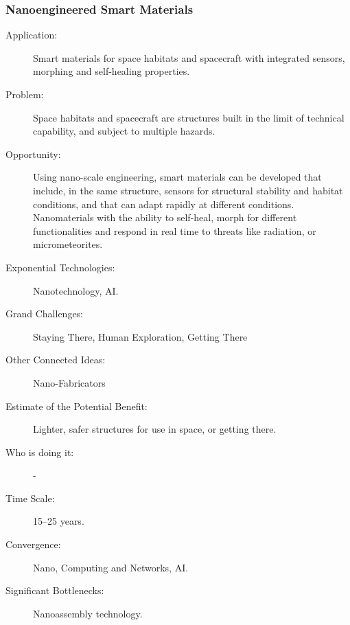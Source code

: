      \subsubsection{Nanoengineered Smart Materials}
 \begin{description}  \item[Application:] Smart materials for space habitats and spacecraft  with integrated sensors, morphing and self-healing properties.
 
  \item[Problem:] Space habitats  and spacecraft are structures built in the
limit of technical capability, and  subject to multiple hazards.
 
  \item[Opportunity:] Using  nano-scale engineering, smart materials can be
developed that include, in the  same structure, sensors for structural
stability  and habitat conditions, and that can adapt rapidly at
different conditions.  Nanomaterials with the ability to self-heal, morph
for different functionalities and  respond in real time to threats like
radiation,  or micrometeorites.
 
  \item[Exponential Technologies:]  Nanotechnology, AI.
 
  \item[Grand Challenges:] Staying  There, Human Exploration, Getting There
 
  \item[Other Connected Ideas:]  Nano-Fabricators
 
  \item[Estimate of the Potential  Benefit:]Lighter, safer structures for use
in space, or getting there.
 
  \item[Who is doing it:] -
 
  \item[Time Scale:] 15--25 years.
 
  \item[Convergence:] Nano,  Computing and Networks, AI.
 
  \item[Significant Bottlenecks:] Nanoassembly technology.
    \end{description}
 
 
